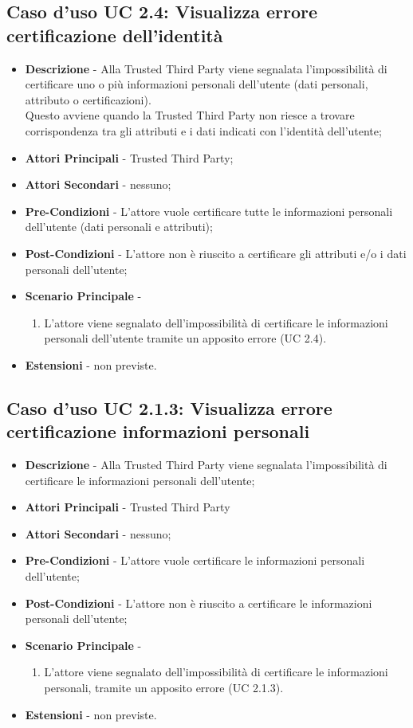 \subsection{Caso d'uso UC 2.4: Visualizza errore certificazione dell'identità}
\begin{itemize}
	\item \textbf{Descrizione} - Alla Trusted Third Party viene segnalata l'impossibilità di certificare uno o più informazioni personali dell'utente (dati personali, attributo o certificazioni).\\
	Questo avviene quando la Trusted Third Party non riesce a trovare corrispondenza tra gli attributi e i dati indicati con l'identità dell'utente;
	\item \textbf{Attori Principali} - Trusted Third Party;
	\item \textbf{Attori Secondari} - nessuno;
	\item \textbf{Pre-Condizioni} - L'attore vuole certificare tutte le informazioni personali dell'utente (dati personali e attributi);
	\item \textbf{Post-Condizioni} - L'attore non è riuscito a certificare gli attributi e/o i dati personali dell'utente;
	\item \textbf{Scenario Principale} -
	\begin{enumerate}
		\item L'attore viene segnalato dell'impossibilità di certificare le informazioni personali dell'utente tramite un apposito errore (UC 2.4).
	\end{enumerate}
	\item \textbf{Estensioni} - non previste.
\end{itemize}
\subsection{Caso d'uso UC 2.1.3: Visualizza errore certificazione informazioni personali}
\begin{itemize}
	\item \textbf{Descrizione} - Alla Trusted Third Party viene segnalata l'impossibilità di certificare le informazioni personali dell'utente;
	\item \textbf{Attori Principali} - Trusted Third Party
	\item \textbf{Attori Secondari} - nessuno;
	\item \textbf{Pre-Condizioni} - L'attore vuole certificare le informazioni personali dell'utente;
	\item \textbf{Post-Condizioni} - L'attore non è riuscito a certificare le informazioni personali dell'utente;
	\item \textbf{Scenario Principale} -
	\begin{enumerate}
		\item L'attore viene segnalato dell'impossibilità di certificare le informazioni personali, tramite un apposito errore (UC 2.1.3).
	\end{enumerate}
	\item \textbf{Estensioni} - non previste.
\end{itemize}
